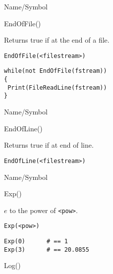 \rl



\begin{desc}{Name/Symbol}
\item[Name/Symbol]	EndOfFile()

\item[Description]	Returns true if at the end of a file.

\item[Usage]
\begin{verbatim}
EndOfFile(<filestream>)
\end{verbatim}

\item[Example]
\begin{verbatim}
while(not EndOfFile(fstream))
{
 Print(FileReadLine(fstream))
}
\end{verbatim}

\item[See Also]	
\end{desc}

\rl



\begin{desc}{Name/Symbol}
\item[Name/Symbol]	EndOfLine()

\item[Description]	Returns true if at end of line.

\item[Usage]
\begin{verbatim}
EndOfLine(<filestream>)
\end{verbatim}

\item[Example]	

\item[See Also]	
\end{desc}

\rl




\begin{desc}{Name/Symbol}
\item[Name/Symbol]  	Exp()

\item[Description]	$e$ to the power of \verb+<pow>+.

\item[Usage]
\begin{verbatim}
Exp(<pow>)
\end{verbatim}

\item[Example]
\begin{verbatim}
Exp(0) 		# == 1
Exp(3)		# == 20.0855
\end{verbatim}

\item[See Also]	Log()
\end{desc}

